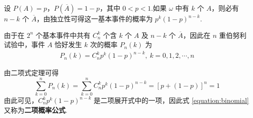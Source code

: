 设 $P(A)=p$，$P(\overline{A}) = 1-p$，其中 $0<p<1$.如果 $\omega$ 中有 $k$ 个 $A$，则必有 $n-k$ 个 $\overline{A}$，由独立性可得这一基本事件的概率为 $p^k (1-p)^{n-k}$.

由于在 $2^n$ 个基本事件中共有 $C_n^k$ 个含 $k$ 个 $A$ 及 $n-k$ 个 $\overline{A}$，因此在 $n$ 重伯努利试验中，事件 $A$ 恰好发生 $k$ 次的概率 $P_n(k)$ 为
\begin{gather} \label{equation:binomial}
    P_n(k)=C_n^k p^k (1-p)^{n-k}, \ k=0,1,2,\cdots,n
\end{gather}

由二项式定理可得
$$
\sum_{k=0}^n P_n(k) = \sum_{k=0}^n C_n^k p^k (1-p)^{n-k} = [p+(1-p)]^n = 1
$$
由此可见，$C_n^k p^k (1-p)^{n-k}$ 是二项展开式中的一项，因此式 \eqref{equation:binomial} 又称为\textbf{二项概率公式}.